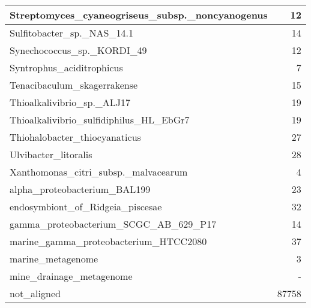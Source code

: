 \documentclass[12pt,a4paper]{article}
\begin{document}
\begin{table}[ht]
\begin{center}
\begin{tabular}{|l*{1}{|r}|}
Streptomyces\_cyaneogriseus\_subsp.\_noncyanogenus & 12 \\ \hline
Sulfitobacter\_sp.\_NAS\_14.1 & 14 \\ \hline
Synechococcus\_sp.\_KORDI\_49 & 12 \\ \hline
Syntrophus\_aciditrophicus & 7 \\ \hline
Tenacibaculum\_skagerrakense & 15 \\ \hline
Thioalkalivibrio\_sp.\_ALJ17 & 19 \\ \hline
Thioalkalivibrio\_sulfidiphilus\_HL\_EbGr7 & 19 \\ \hline
Thiohalobacter\_thiocyanaticus & 27 \\ \hline
Ulvibacter\_litoralis & 28 \\ \hline
Xanthomonas\_citri\_subsp.\_malvacearum & 4 \\ \hline
alpha\_proteobacterium\_BAL199 & 23 \\ \hline
endosymbiont\_of\_Ridgeia\_piscesae & 32 \\ \hline
gamma\_proteobacterium\_SCGC\_AB\_629\_P17 & 14 \\ \hline
marine\_gamma\_proteobacterium\_HTCC2080 & 37 \\ \hline
marine\_metagenome & 3 \\ \hline
mine\_drainage\_metagenome & - \\ \hline
not\_aligned & 87758 \\ \hline
\end{tabular}
\end{center}
\end{table}
\end{document}
